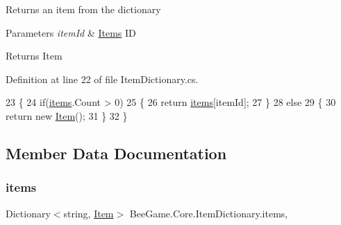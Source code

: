 Returns an item from the dictionary 


\begin{DoxyParams}{Parameters}
{\em item\+Id} & \hyperlink{namespace_bee_game_1_1_items}{Items} ID\\
\hline
\end{DoxyParams}
\begin{DoxyReturn}{Returns}
Item
\end{DoxyReturn}


Definition at line 22 of file Item\+Dictionary.\+cs.


\begin{DoxyCode}
23         \{
24             \textcolor{keywordflow}{if}(\hyperlink{class_bee_game_1_1_core_1_1_item_dictionary_aa9828e91ace773227fd20008786b6a22}{items}.Count > 0)
25             \{
26                 \textcolor{keywordflow}{return} \hyperlink{class_bee_game_1_1_core_1_1_item_dictionary_aa9828e91ace773227fd20008786b6a22}{items}[itemId];
27             \}
28             \textcolor{keywordflow}{else}
29             \{
30                 \textcolor{keywordflow}{return} \textcolor{keyword}{new} \hyperlink{struct_bee_game_1_1_items_1_1_item}{Item}();
31             \}            
32         \}
\end{DoxyCode}


\subsection{Member Data Documentation}
\mbox{\label{class_bee_game_1_1_core_1_1_item_dictionary_aa9828e91ace773227fd20008786b6a22}} 
\subsubsection{\texorpdfstring{items}{items}}
{\footnotesize\ttfamily Dictionary$<$string, \hyperlink{struct_bee_game_1_1_items_1_1_item}{Item}$>$ Bee\+Game.\+Core.\+Item\+Dictionary.\+items\hspace{0.3cm}{\ttfamily [static]}, {\ttfamily [private]}}

